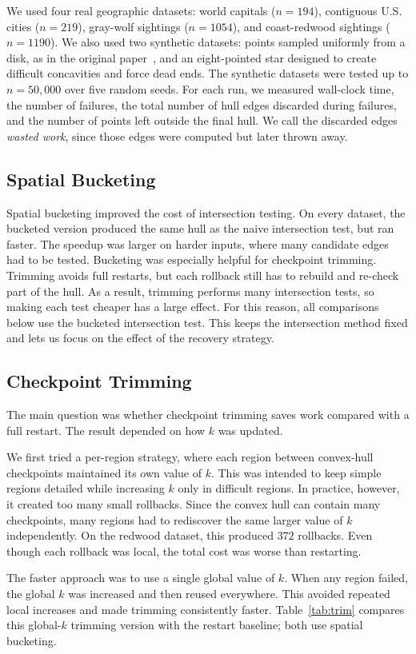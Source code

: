 \documentclass[10pt,twocolumn]{article}
\begin{document}
We used four real geographic datasets: world capitals ($n=194$), contiguous U.S.
cities ($n=219$), gray-wolf sightings ($n=1054$), and coast-redwood sightings
($n=1190$). We also used two synthetic datasets: points sampled uniformly from a
disk, as in the original paper~\cite{moreira2007}, and an eight-pointed star designed
to create difficult concavities and force dead ends. The synthetic datasets were
tested up to $n=50{,}000$ over five random seeds.
For each run, we measured wall-clock time, the number of failures, the total number
of hull edges discarded during failures, and the number of points left outside the
final hull. We call the discarded edges \emph{wasted work}, since those edges were
computed but later thrown away.
\subsection{Spatial Bucketing}
Spatial bucketing improved the cost of intersection testing. On every dataset, the
bucketed version produced the same hull as the naive intersection test, but ran
faster. The speedup was larger on harder inputs, where many candidate edges had to be
tested.
Bucketing was especially helpful for checkpoint trimming. Trimming avoids full
restarts, but each rollback still has to rebuild and re-check part of the hull. As a
result, trimming performs many intersection tests, so making each test cheaper has a
large effect. For this reason, all comparisons below use the bucketed intersection
test. This keeps the intersection method fixed and lets us focus on the effect of the
recovery strategy.
\subsection{Checkpoint Trimming}
The main question was whether checkpoint trimming saves work compared with a full restart. The result depended on how \(k\) was updated. 

We first tried a per-region strategy, where each region between convex-hull checkpoints maintained its own value of \(k\). This was intended to keep simple regions detailed while increasing \(k\) only in difficult regions. In practice, however, it created too many small rollbacks. Since the convex hull can contain many checkpoints, many regions had to rediscover the same larger value of \(k\) independently. On the redwood dataset, this produced \(372\) rollbacks. Even though each rollback was local, the total cost was worse than restarting. 

The faster approach was to use a single global value of \(k\). When any region failed, the global \(k\) was increased and then reused everywhere. This avoided repeated local increases and made trimming consistently faster. Table~\ref{tab:trim} compares this global-\(k\) trimming version with the restart baseline; both use spatial bucketing. 
\end{document}
